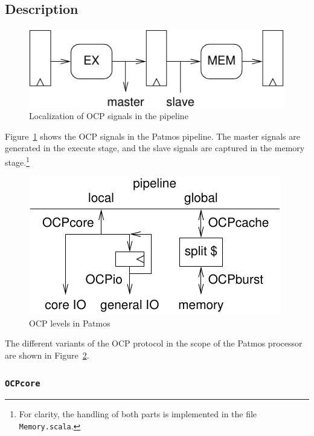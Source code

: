 \documentclass[a4paper,fontsize=10pt,twoside,DIV15,BCOR12mm,headinclude=true,footinclude=false,pagesize,bibtotoc]{scrbook}
\newcommand{\code}[1]{{\texttt{#1}}}
\begin{document}
\subsection{Description}

\begin{figure}
  \centering
  \includegraphics[scale=.8]{fig/ocppipe}
  \caption{Localization of OCP signals in the pipeline}
  \label{fig:ocppipe}
\end{figure}

Figure~\ref{fig:ocppipe} shows the OCP signals in the Patmos
pipeline. The master signals are generated in the execute stage, and
the slave signals are captured in the memory stage.\footnote{For
  clarity, the handling of both parts is implemented in the file
  \code{Memory.scala}.}

\begin{figure}
  \centering
  \includegraphics[scale=.8]{fig/ocplevels}
  \caption{OCP levels in Patmos}
  \label{fig:ocplevels}
\end{figure}

The different variants of the OCP protocol in the scope of the Patmos
processor are shown in Figure~\ref{fig:ocplevels}.

\subsubsection{\code{OCPcore}}
\end{document}
